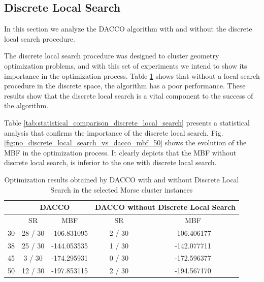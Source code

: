 		\subsection{Discrete Local Search}
		
		In this section we analyze the DACCO algorithm with and without the discrete local search procedure. 
		
		The discrete local search procedure was designed to cluster geometry optimization problems, and with this set of experiments we intend to show its importance in the optimization process.
		Table \ref{tab:discrete_local_search_results} shows that without a local search procedure in the discrete space, the algorithm has a poor performance. These results show that the discrete local search is a vital component to the success of the algorithm. 
		
		Table \ref{tab:statistical_comparison_discrete_local_search} presents a statistical analysis that confirms the importance of the discrete local search.
		Fig. \ref{fig:no_discrete_local_search_vs_dacco_mbf_50} shows the evolution of the MBF in the optimization process. It clearly depicts that the MBF without discrete local search, is inferior to the one with discrete local search.
		
		\begin{table}[!htdp]
				\begin{center}
					\begin{tabular}{| c | c | c | c | c |}
						\hline
						~ & \multicolumn{2}{c|}{\textbf{DACCO}} & \multicolumn{2}{p{4cm}|}{\textbf{DACCO without Discrete Local Search}} \\ \hline
						~ & SR & MBF & SR & MBF \\ \hline
						30 & 28 / 30 & -106.831095 & 2 / 30 & -106.406177 \\ \hline
						38 & 25 / 30 & -144.053535 & 1 / 30 & -142.077711 \\ \hline
						45 & 3 / 30 & -174.295931 & 0 / 30 & -172.596377 \\ \hline
						50 & 12 / 30 & -197.853115 & 2 / 30 & -194.567170 \\ \hline
					\end{tabular}
					\caption{Optimization results obtained by DACCO with and without Discrete Local Search in the selected Morse cluster instances}
					\label{tab:discrete_local_search_results}
				\end{center}
		\end{table}
		
